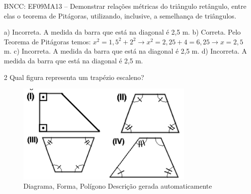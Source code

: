 \begin{escolha}
\begin{boxmedio}
\begin{boxmedio}
{\begin{boxpeq}
\begin{boxpeq}
{\begin{boxpeq}
\begin{boxmedio}
\begin{boxmedio}
\begin{boxpeq}
\begin{boxmedio}
\begin{boxpeq}
\begin{boxpeq}
\begin{boxpeq}
\begin{boxpeq}
\begin{boxmedio}
{\begin{boxmedio}
\begin{boxmedio}
\begin{boxpeq}
\begin{boxmedio}
\begin{boxpeq}
\begin{boxpeq}
\begin{boxpeq}
\begin{escolha}
{\begin{boxmedio}
\begin{boxpeq}
\begin{boxpeq}
\begin{boxpeq}
\begin{boxpeq}
\begin{boxpeq}
\begin{boxmedio}
\begin{boxpeq}
\begin{boxpeq}
\begin{boxpeq}
{\begin{boxpeq}
\begin{boxmedio}
\begin{boxpeq}
\begin{boxpeq}
\begin{boxpeq}
{\begin{boxpeq}
\begin{boxmedio}
{\begin{boxpeq}
\begin{boxpeq}
\begin{boxmedio}
\begin{boxmedio}
\begin{boxpeq}
\begin{boxpeq}
{\begin{boxpeq}
\begin{boxpeq}
\begin{boxpeq}
\begin{boxpeq}
\begin{boxpeq}
\begin{escolha}
\begin{escolha}
{\begin{boxmedio}
\begin{boxpeq}
\begin{q°}
\begin{boxmedio}
\begin{boxpeq}
\begin{boxpeq}
\begin{boxmedio}
\begin{boxmedio}
\begin{boxmedio}
{BNCC: EF09MA13 -- Demonstrar relações métricas do triângulo retângulo, entre elas o teorema de Pitágoras, utilizando, inclusive, a semelhança de triângulos.

a) Incorreta. A medida da barra que está na diagonal é 2,5 m.
b) Correta. Pelo Teorema de Pitágoras temos: $x^2 = 1,5^2 + 2^2 \rightarrow 
x^2 = 2,25 + 4 = 6,25 \rightarrow x = 2,5$ m.
c) Incorreta. A medida da barra que está na diagonal é 2,5 m.
d) Incorreta. A medida da barra que está na diagonal é 2,5 m.}

\num{2} Qual figura representa um trapézio escaleno?

\begin{figure}
\centering
\includegraphics[width=3.44197in,height=1.9335in]{./_SAEB_9_MAT/media/image193.png}
\caption{Diagrama, Forma, Polígono Descrição gerada automaticamente}
\end{figure}



\end{boxmedio}
\end{boxmedio}
\end{boxmedio}
\end{boxpeq}
\end{boxpeq}
\end{boxmedio}
\end{q°}
\end{boxpeq}
\end{boxmedio}}
\end{escolha}
\end{escolha}
\end{boxpeq}
\end{boxpeq}
\end{boxpeq}
\end{boxpeq}
\end{boxpeq}}
\end{boxpeq}
\end{boxpeq}
\end{boxmedio}
\end{boxmedio}
\end{boxpeq}
\end{boxpeq}}
\end{boxmedio}
\end{boxpeq}}
\end{boxpeq}
\end{boxpeq}
\end{boxpeq}
\end{boxmedio}
\end{boxpeq}}
\end{boxpeq}
\end{boxpeq}
\end{boxpeq}
\end{boxmedio}
\end{boxpeq}
\end{boxpeq}
\end{boxpeq}
\end{boxpeq}
\end{boxpeq}
\end{boxmedio}}
\end{escolha}
\end{boxpeq}
\end{boxpeq}
\end{boxpeq}
\end{boxmedio}
\end{boxpeq}
\end{boxmedio}
\end{boxmedio}}
\end{boxmedio}
\end{boxpeq}
\end{boxpeq}
\end{boxpeq}
\end{boxpeq}
\end{boxmedio}
\end{boxpeq}
\end{boxmedio}
\end{boxmedio}
\end{boxpeq}}
\end{boxpeq}
\end{boxpeq}}
\end{boxmedio}
\end{boxmedio}
\end{escolha}
